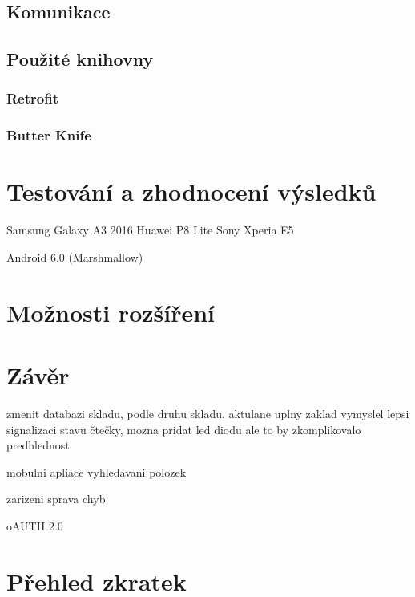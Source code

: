 \documentclass[czech,BP]{thesiskiv}
\begin{document}
	\section{Komunikace}

	
		

	\section{Použité knihovny}
		\subsection{Retrofit}
		\subsection{Butter Knife}

\chapter{Testování a zhodnocení výsledků}	

Samsung Galaxy A3 2016
Huawei P8 Lite
Sony Xperia E5

Android 6.0 (Marshmallow)


\chapter{Možnosti rozšíření}


\chapter{Závěr}

zmenit databazi skladu, podle druhu skladu, aktulane uplny zaklad
vymyslel lepsi signalizaci stavu čtečky, mozna pridat led diodu ale to by zkomplikovalo predhlednost 

mobulni apliace
vyhledavani polozek

zarizeni sprava chyb

oAUTH 2.0


\chapter*{Přehled zkratek}
\end{document}
